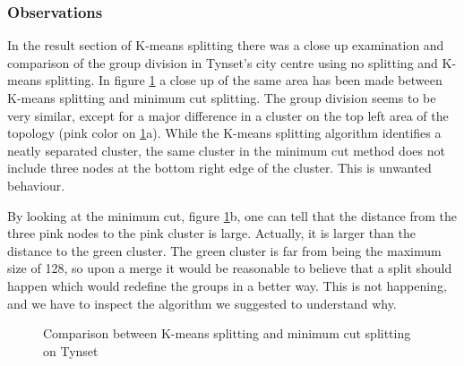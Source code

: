 \subsubsection{Observations}
In the result section of K-means splitting there was a close up examination and comparison of the group division in Tynset's city centre using no splitting and K-means splitting.
In figure \ref{fig:mincutcomparison} a close up of the same area has been made between K-means splitting and minimum cut splitting. The group division seems to 
be very similar, except for a major difference in a cluster on the top left area of the topology (pink color on \ref{fig:mincutcomparison}a).
While the K-means splitting algorithm identifies a neatly separated cluster, the same cluster in the minimum cut method does not include three nodes at the bottom right edge of the cluster.
This is unwanted behaviour. 

By looking at the minimum cut, figure \ref{fig:mincutcomparison}b, one can tell that the distance from the three pink nodes to the pink cluster is large.
Actually, it is larger than the distance to the green cluster. The green cluster is far from being the maximum size of 128, so upon a merge it would be reasonable to believe
that a split should happen which would redefine the groups in a better way. This is not happening, and we have to inspect the algorithm we suggested to understand why. 
\begin{figure}
	\centering
		\qquad
		\caption{Comparison between K-means splitting and minimum cut splitting on Tynset}%
		\label{fig:mincutcomparison}%
\end{figure}



